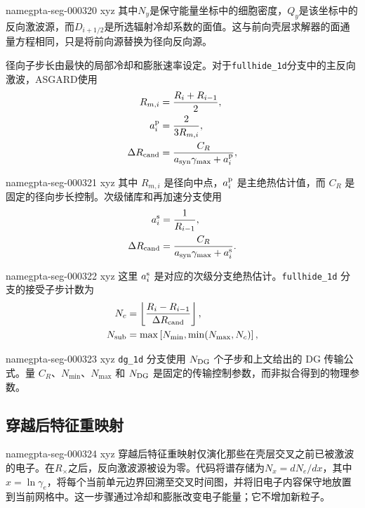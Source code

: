 \documentclass[twocolumn]{aastex702}
\makeatletter
\newcommand{\asgard}{\textsc{ASGARD}}
\providecommand{\gptareaderanchor}[1]{\pdfdest name{#1} xyz}%
\providecommand{\gptareaderanchor}[1]{\special{pdf:dest (#1) [ @thispage /XYZ @xpos @ypos null ]}}%
\makeatother
\begin{document}
\gptareaderanchor{gpta-seg-000320}%
其中\(N_y\)是保守能量坐标中的细胞密度，\(Q_y\)是该坐标中的反向激波源，而\(D_{i+1/2}\)是所选辐射冷却系数的面值。这与前向壳层求解器的面通量方程相同，只是将前向源替换为径向反向源。

径向子步长由最快的局部冷却和膨胀速率设定。对于\texttt{fullhide\_1d}分支中的主反向激波，\asgard{}使用
\begin{equation}
\begin{aligned}
R_{m,i}&=\frac{R_i+R_{i-1}}{2},\\
a_i^{\rm p}&=\frac{2}{3R_{m,i}},\\
\Delta R_{\rm cand}
&=\frac{C_R}{a_{\rm syn}\gamma_{\max}+a_i^{\rm p}},
\end{aligned}
\end{equation}

\gptareaderanchor{gpta-seg-000321}%
其中 \(R_{m,i}\) 是径向中点，\(a_i^{\rm p}\) 是主绝热估计值，而 \(C_R\) 是固定的径向步长控制。次级储库和再加速分支使用
\begin{equation}
\begin{aligned}
a_i^{\rm s}&=\frac{1}{R_{i-1}},\\
\Delta R_{\rm cand}
&=\frac{C_R}{a_{\rm syn}\gamma_{\max}+a_i^{\rm s}}.
\end{aligned}
\end{equation}

\gptareaderanchor{gpta-seg-000322}%
这里 \(a_i^{\rm s}\) 是对应的次级分支绝热估计。\texttt{fullhide\_1d} 分支的接受子步计数为
\begin{equation}
\begin{aligned}
N_c&=\left\lfloor\frac{R_i-R_{i-1}}{\Delta R_{\rm cand}}\right\rfloor,\\
N_{\rm sub}&=\max\left[N_{\min},\min(N_{\max},N_c)\right],
\end{aligned}
\end{equation}

\gptareaderanchor{gpta-seg-000323}%
\texttt{dg\_1d} 分支使用 \(N_{\rm DG}\) 个子步和上文给出的 DG 传输公式。量 \(C_R\)、\(N_{\min}\)、\(N_{\max}\) 和 \(N_{\rm DG}\) 是固定的传输控制参数，而非拟合得到的物理参数。

\subsection{穿越后特征重映射}


\gptareaderanchor{gpta-seg-000324}%
穿越后特征重映射仅演化那些在壳层交叉之前已被激波的电子。在\(R_\times\)之后，反向激波源被设为零。代码将谱存储为\(N_x=dN_e/dx\)，其中\(x=\ln\gamma_e\)，将每个当前单元边界回溯至交叉时间图，并将旧电子内容保守地放置到当前网格中。这一步骤通过冷却和膨胀改变电子能量；它不增加新粒子。
\end{document}
